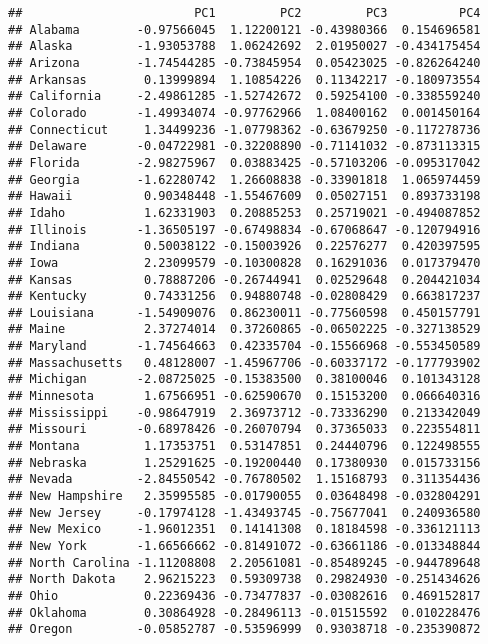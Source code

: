\documentclass[]{article}
\begin{document}
\begin{verbatim}
##                        PC1         PC2         PC3          PC4
## Alabama        -0.97566045  1.12200121 -0.43980366  0.154696581
## Alaska         -1.93053788  1.06242692  2.01950027 -0.434175454
## Arizona        -1.74544285 -0.73845954  0.05423025 -0.826264240
## Arkansas        0.13999894  1.10854226  0.11342217 -0.180973554
## California     -2.49861285 -1.52742672  0.59254100 -0.338559240
## Colorado       -1.49934074 -0.97762966  1.08400162  0.001450164
## Connecticut     1.34499236 -1.07798362 -0.63679250 -0.117278736
## Delaware       -0.04722981 -0.32208890 -0.71141032 -0.873113315
## Florida        -2.98275967  0.03883425 -0.57103206 -0.095317042
## Georgia        -1.62280742  1.26608838 -0.33901818  1.065974459
## Hawaii          0.90348448 -1.55467609  0.05027151  0.893733198
## Idaho           1.62331903  0.20885253  0.25719021 -0.494087852
## Illinois       -1.36505197 -0.67498834 -0.67068647 -0.120794916
## Indiana         0.50038122 -0.15003926  0.22576277  0.420397595
## Iowa            2.23099579 -0.10300828  0.16291036  0.017379470
## Kansas          0.78887206 -0.26744941  0.02529648  0.204421034
## Kentucky        0.74331256  0.94880748 -0.02808429  0.663817237
## Louisiana      -1.54909076  0.86230011 -0.77560598  0.450157791
## Maine           2.37274014  0.37260865 -0.06502225 -0.327138529
## Maryland       -1.74564663  0.42335704 -0.15566968 -0.553450589
## Massachusetts   0.48128007 -1.45967706 -0.60337172 -0.177793902
## Michigan       -2.08725025 -0.15383500  0.38100046  0.101343128
## Minnesota       1.67566951 -0.62590670  0.15153200  0.066640316
## Mississippi    -0.98647919  2.36973712 -0.73336290  0.213342049
## Missouri       -0.68978426 -0.26070794  0.37365033  0.223554811
## Montana         1.17353751  0.53147851  0.24440796  0.122498555
## Nebraska        1.25291625 -0.19200440  0.17380930  0.015733156
## Nevada         -2.84550542 -0.76780502  1.15168793  0.311354436
## New Hampshire   2.35995585 -0.01790055  0.03648498 -0.032804291
## New Jersey     -0.17974128 -1.43493745 -0.75677041  0.240936580
## New Mexico     -1.96012351  0.14141308  0.18184598 -0.336121113
## New York       -1.66566662 -0.81491072 -0.63661186 -0.013348844
## North Carolina -1.11208808  2.20561081 -0.85489245 -0.944789648
## North Dakota    2.96215223  0.59309738  0.29824930 -0.251434626
## Ohio            0.22369436 -0.73477837 -0.03082616  0.469152817
## Oklahoma        0.30864928 -0.28496113 -0.01515592  0.010228476
## Oregon         -0.05852787 -0.53596999  0.93038718 -0.235390872

\end{verbatim}
\end{document}
